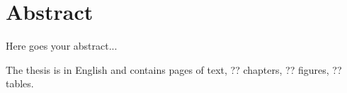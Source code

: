 \section*{\centering Abstract}
Here goes your abstract...



The thesis is in English and contains \pageref{LastPage} pages of text, ?? chapters, ?? figures, ?? tables.
\pagebreak
